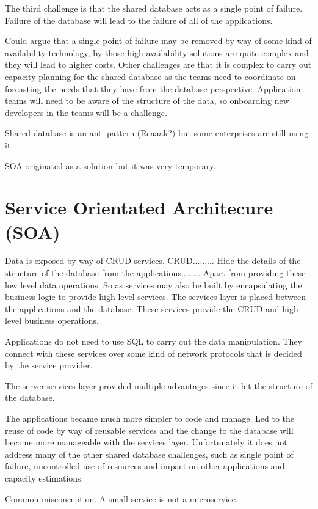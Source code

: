 \documentclass[a4paper, 11pt]{book}
\begin{document}
    The third challenge is that the shared database acts as a single point of failure.
    Failure of the database will lead to the failure of all of the applications.

    Could argue that a single point of failure may be removed by way of some kind of availability technology, by those high availability solutions are quite complex and they will lead to higher costs.
    Other challenges are that it is complex to carry out capacity planning for the shared database as the teams need to coordinate on forcasting the needs that they have from the database perspective.
    Application teams will need to be aware of the structure of the data, so onboarding new developers in the teams will be a challenge.

    Shared database is an anti-pattern (Reaaak?) but some enterprises are still using it.

    SOA originated as a solution but it was very temporary.


    \section{Service Orientated Architecure (SOA)}
    Data is exposed by way of CRUD services.
    CRUD.........
    Hide the details of the structure of the database from the applications........
    Apart from providing these low level data operations.
    So as services may also be built by encapsulating the business logic to provide high level services.
    The services layer is placed between the applications and the database.
    These services provide the CRUD and high level business operations.

    Applications do not need to use SQL to carry out the data manipulation.
    They connect with these services over some kind of network protocols that is decided by the service provider.

    The server services layer provided multiple advantages since it hit the structure of the database.

    The applications became much more simpler to code and manage.
    Led to the reuse of code by way of reusable services and the change to the database will become more manageable with the services layer.
    Unfortunately it does not address many of the other shared database challenges, such as single point of failure, uncontrolled use of resources and impact on other applications and capacity estimations.

    Common misconception.
    A small service is not a microservice.
\end{document}
